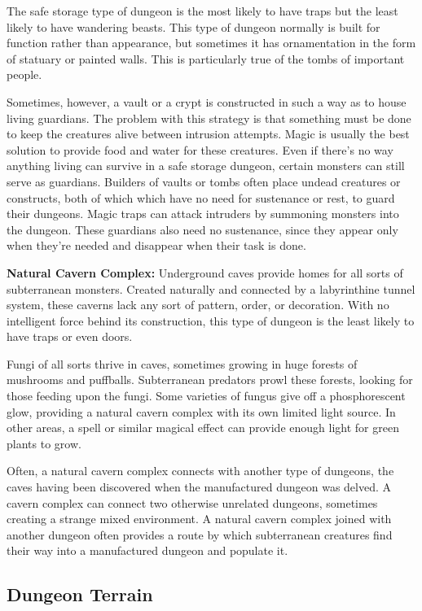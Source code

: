 The safe storage type of dungeon is the most likely to have traps but the least likely to have wandering beasts. This type of dungeon normally is built for function rather than appearance, but sometimes it has ornamentation in the form of statuary or painted walls. This is particularly true of the tombs of important people.

Sometimes, however, a vault or a crypt is constructed in such a way as to house living guardians. The problem with this strategy is that something must be done to keep the creatures alive between intrusion attempts. Magic is usually the best solution to provide food and water for these creatures. Even if there's no way anything living can survive in a safe storage dungeon, certain monsters can still serve as guardians. Builders of vaults or tombs often place undead creatures or constructs, both of which which have no need for sustenance or rest, to guard their dungeons. Magic traps can attack intruders by summoning monsters into the dungeon. These guardians also need no sustenance, since they appear only when they're needed and disappear when their task is done.

\textbf{Natural Cavern Complex:} Underground caves provide homes for all sorts of subterranean monsters. Created naturally and connected by a labyrinthine tunnel system, these caverns lack any sort of pattern, order, or decoration. With no intelligent force behind its construction, this type of dungeon is the least likely to have traps or even doors.

Fungi of all sorts thrive in caves, sometimes growing in huge forests of mushrooms and puffballs. Subterranean predators prowl these forests, looking for those feeding upon the fungi. Some varieties of fungus give off a phosphorescent glow, providing a natural cavern complex with its own limited light source. In other areas, a spell or similar magical effect can provide enough light for green plants to grow.

Often, a natural cavern complex connects with another type of dungeons, the caves having been discovered when the manufactured dungeon was delved. A cavern complex can connect two otherwise unrelated dungeons, sometimes creating a strange mixed environment. A natural cavern complex joined with another dungeon often provides a route by which subterranean creatures find their way into a manufactured dungeon and populate it.

\subsection{Dungeon Terrain}

